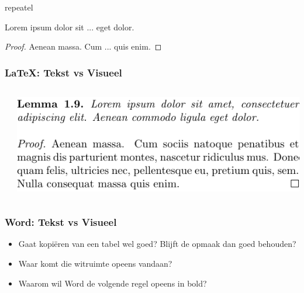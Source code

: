 \documentclass[../presentatie.tex]{subfiles}
\begin{document}
	\begin{saveblock}{repeatel}
		\begin{highlightblock}[linewidth=0.5\textwidth,gobble=12]
			\begin{lemma}
				Lorem ipsum dolor sit
				... eget dolor.
				
				\begin{proof}
					Aenean massa. Cum
					... quis enim.
				\end{proof}
			\end{lemma}
		\end{highlightblock}
	\end{saveblock}

	\begin{frame}
		\frametitle{\LaTeX: Tekst vs Visueel}
		\begin{columns}
			\begin{column}{0.5\textwidth}
			\end{column}
			\begin{column}{0.5\textwidth}
				\includegraphics[width=\linewidth,height=0.8\textheight,keepaspectratio]{assets/latexRepeatEl.pdf}
			\end{column}
		\end{columns}
	\end{frame}
    
    \begin{frame}
        \frametitle{Word: Tekst vs Visueel}
        
        \begin{itemize}
            \item Gaat kopiëren van een tabel wel goed? Blijft de opmaak dan goed behouden?
            \item Waar komt die witruimte opeens vandaan?
            \item Waarom wil Word de volgende regel opeens in bold?
        \end{itemize}
    
    \end{frame}
    
\end{document}
